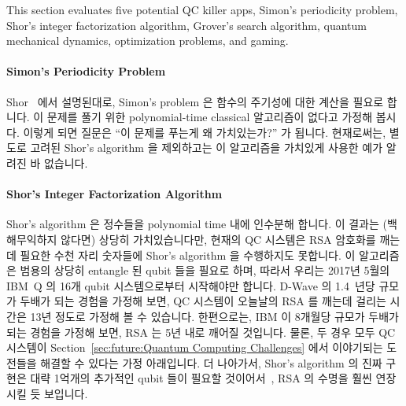 This section evaluates five potential QC killer apps,
Simon's periodicity problem,
Shor's integer factorization algorithm,
Grover's search algorithm,
quantum mechanical dynamics,
optimization problems, and
gaming.
\fi

\paragraph{Simon's Periodicity Problem}
\label{sec:future:Simon's Periodicity Problem}

Shor~\cite{PeterWSchor2001QuantumAlgorithms} 에서 설명된대로, Simon's problem
은 함수의 주기성에 대한 계산을 필요로 합니다.
이 문제를 풀기 위한 polynomial-time classical 알고리즘이 없다고 가정해 봅시다.
이렇게 되면 질문은 ``이 문제를 푸는게 왜 가치있는가?'' 가 됩니다.
현재로써는, 별도로 고려된 Shor's algorithm 을 제외하고는 이 알고리즘을 가치있게
사용한 예가 알려진 바 없습니다.

\paragraph{Shor's Integer Factorization Algorithm}
\label{sec:future:Shor's Integer Factorization Algorithm}

Shor's algorithm 은 정수들을 polynomial time 내에 인수분해 합니다.
이 결과는 (백해무익하지 않다면) 상당히 가치있습니다만, 현재의 QC 시스템은 RSA
암호화를 깨는데 필요한 수천 자리 숫자들에 Shor's algorithm 을 수행하지도
못합니다.
이 알고리즘은 범용의 상당히 entangle 된 qubit 들을 필요로 하며, 따라서 우리는
2017년 5월의 IBM~Q 의 16개 qubit 시스템으로부터 시작해야만 합니다.
D-Wave 의 1.4~년당 규모가 두배가 되는 경험을 가정해 보면, QC 시스템이 오늘날의
RSA 를 깨는데 걸리는 시간은 13년 정도로 가정해 볼 수 있습니다.
한편으로는, IBM 이 8개월당 규모가 두배가 되는 경험을 가정해 보면, RSA 는 5년
내로 깨어질 것입니다.
물론, 두 경우 모두 QC 시스템이
Section~\ref{sec:future:Quantum Computing Challenges} 에서 이야기되는 도전들을
해결할 수 있다는 가정 아래입니다.
더 나아가서, Shor's algorithm 의 진짜 구현은 대략 1억개의 추가적인 qubit 들이
필요할 것이어서~\cite{RachelCourtland2017GoogleQC}, RSA 의 수명을 훨씬 연장시킬
듯 보입니다.


